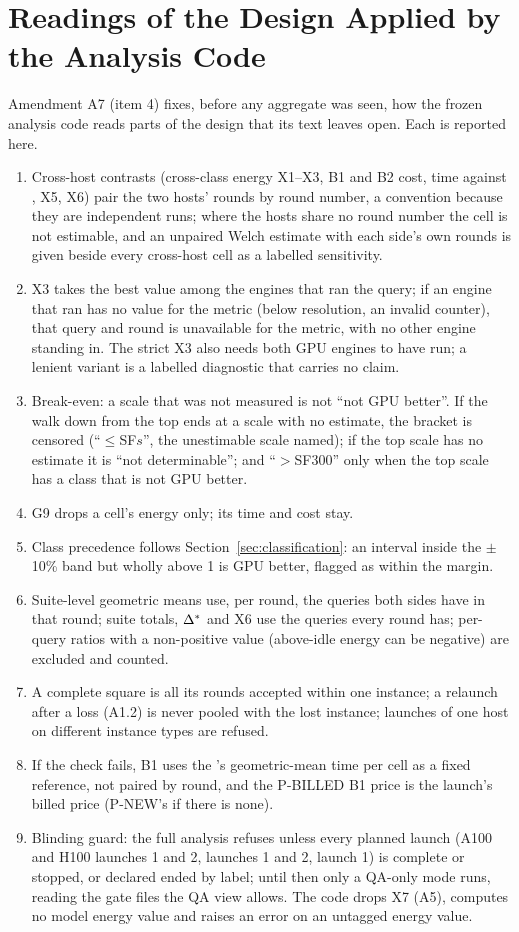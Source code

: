 \documentclass[sigconf]{acmart}
\begin{document}
\section{Readings of the Design Applied by the Analysis Code}
\label{app:readings}
Amendment A7 (item 4) fixes, before any aggregate was seen, how the frozen analysis code reads
parts of the design that its text leaves open. Each is reported here.
\begin{enumerate}[label=(\alph*)]
\item Cross-host contrasts (cross-class energy X1--X3, B1 and B2 cost, time against \CG, X5, X6)
  pair the two hosts' rounds by round number, a convention because they are independent runs; where
  the hosts share no round number the cell is not estimable, and an unpaired Welch estimate with
  each side's own rounds is given beside every cross-host cell as a labelled sensitivity.
\item X3 takes the best value among the engines that ran the query; if an engine that ran has no
  value for the metric (below resolution, an invalid counter), that query and round is unavailable
  for the metric, with no other engine standing in. The strict X3 also needs both GPU engines to
  have run; a lenient variant is a labelled diagnostic that carries no claim.
\item Break-even: a scale that was not measured is not ``not GPU better''. If the walk down from
  the top ends at a scale with no estimate, the bracket is censored (``$\le$SF$s$'', the
  unestimable scale named); if the top scale has no estimate it is ``not determinable''; and
  ``$>$SF300'' only when the top scale has a class that is not GPU better.
\item G9 drops a cell's energy only; its time and cost stay.
\item Class precedence follows Section~\ref{sec:classification}: an interval inside the
  $\pm$10\% band but wholly above 1 is GPU better, flagged as within the margin.
\item Suite-level geometric means use, per round, the queries both sides have in that round;
  suite totals, $\Delta^{*}$ and X6 use the queries every round has; per-query ratios with a
  non-positive value (above-idle energy can be negative) are excluded and counted.
\item A complete square is all its rounds accepted within one instance; a relaunch after a loss
  (A1.2) is never pooled with the lost instance; launches of one host on different instance types
  are refused.
\item If the \CV{} check fails, B1 uses the \CV's geometric-mean time per cell as a fixed
  reference, not paired by round, and the P-BILLED B1 price is the \CV{} launch's billed price
  (P-NEW's if there is none).
\item Blinding guard: the full analysis refuses unless every planned launch (A100 and H100
  launches 1 and 2, \CG{} launches 1 and 2, \CV{} launch 1) is complete or stopped, or declared
  ended by label; until then only a QA-only mode runs, reading the gate files the QA view allows.
  The code drops X7 (A5), computes no model energy value and raises an error on an untagged energy
  value.
\end{enumerate}
\end{document}
